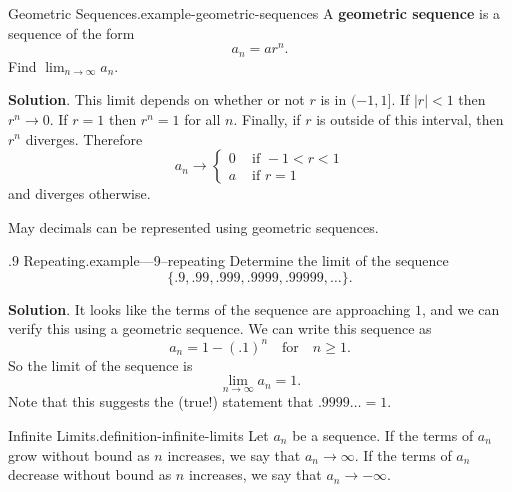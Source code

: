 \documentclass[10pt,]{book}
\newcommand{\terminology}[1]{\textbf{#1}}
\numberwithin{equation}{section}
\newcommand{\lt}{<}
\newcommand{\amp}{&}
\begin{document}
\begin{example}{Geometric Sequences.}{example-geometric-sequences}%
\hypertarget{p-800}{}%
A \terminology{geometric sequence} is a sequence of the form%
\begin{equation*}
a_{n} = ar^{n}.
\end{equation*}
Find \(\lim_{n\to\infty}a_{n}\).%
\par\smallskip%
\noindent\textbf{Solution}.\hypertarget{solution-165}{}\quad%
\hypertarget{p-801}{}%
This limit depends on whether or not \(r\) is in \((-1,1]\). If \(|r| \lt 1\) then \(r^{n}\to 0\). If \(r = 1\) then \(r^{n} = 1\) for all \(n\). Finally, if \(r\) is outside of this interval, then \(r^{n}\) diverges. Therefore%
\begin{equation*}
a_{n} \to \begin{cases} 0 \amp \text{ if } -1 \lt r \lt 1 \\ a \amp \text{ if } r = 1 \end{cases}
\end{equation*}
and diverges otherwise.%
\end{example}
\hypertarget{p-802}{}%
May decimals can be represented using geometric sequences.%
\begin{example}{\(.9\) Repeating.}{example---9--repeating}%
\hypertarget{p-803}{}%
Determine the limit of the sequence%
\begin{equation*}
\{.9, .99, .999, .9999, .99999, \ldots\}\text{.}
\end{equation*}
%
\par\smallskip%
\noindent\textbf{Solution}.\hypertarget{solution-166}{}\quad%
\hypertarget{p-804}{}%
It looks like the terms of the sequence are approaching \(1\), and we can verify this using a geometric sequence. We can write this sequence as%
\begin{equation*}
a_{n} = 1 - (.1)^{n}\quad\text{for}\quad n\geq 1\text{.}
\end{equation*}
So the limit of the sequence is%
\begin{equation*}
\lim_{n\to\infty}a_{n} = 1\text{.}
\end{equation*}
Note that this suggests the (true!) statement that \(.9999\ldots = 1\).%
\end{example}
\begin{definition}{Infinite Limits.}{definition-infinite-limits}%
\hypertarget{p-805}{}%
Let \(a_{n}\) be a sequence. If the terms of \(a_{n}\) grow without bound as \(n\) increases, we say that \(a_{n}\to\infty\). If the terms of \(a_{n}\) decrease without bound as \(n\) increases, we say that \(a_{n}\to-\infty\).%
\end{definition}
\end{document}
